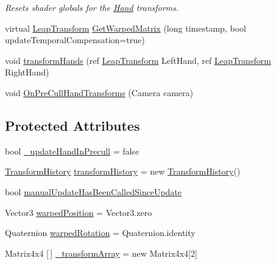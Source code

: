 \begin{DoxyCompactItemize}
\begin{DoxyCompactList}\small\item\em Resets shader globals for the \mbox{\hyperlink{class_leap_1_1_hand}{Hand}} transforms. \end{DoxyCompactList}\item 
virtual \mbox{\hyperlink{struct_leap_1_1_leap_transform}{Leap\+Transform}} \mbox{\hyperlink{class_leap_1_1_unity_1_1_leap_x_r_service_provider_a5a7dd26c6fcf64f5bd085be124fd69ed}{Get\+Warped\+Matrix}} (long timestamp, bool update\+Temporal\+Compensation=true)
\item 
void \mbox{\hyperlink{class_leap_1_1_unity_1_1_leap_x_r_service_provider_ad85fd202780306f400ee2609b37d3293}{transform\+Hands}} (ref \mbox{\hyperlink{struct_leap_1_1_leap_transform}{Leap\+Transform}} Left\+Hand, ref \mbox{\hyperlink{struct_leap_1_1_leap_transform}{Leap\+Transform}} Right\+Hand)
\item 
void \mbox{\hyperlink{class_leap_1_1_unity_1_1_leap_x_r_service_provider_a87c7baea1161c7819c2215f9483e6df6}{On\+Pre\+Cull\+Hand\+Transforms}} (Camera camera)
\end{DoxyCompactItemize}
\subsection*{Protected Attributes}
\begin{DoxyCompactItemize}
\item 
bool \mbox{\hyperlink{class_leap_1_1_unity_1_1_leap_x_r_service_provider_a5467eed05493c0cf4cc732568596f6eb}{\+\_\+update\+Hand\+In\+Precull}} = false
\item 
\mbox{\hyperlink{class_leap_1_1_unity_1_1_transform_history}{Transform\+History}} \mbox{\hyperlink{class_leap_1_1_unity_1_1_leap_x_r_service_provider_ad28d54cc0444a3ead31ecc3214e58b32}{transform\+History}} = new \mbox{\hyperlink{class_leap_1_1_unity_1_1_transform_history}{Transform\+History}}()
\item 
bool \mbox{\hyperlink{class_leap_1_1_unity_1_1_leap_x_r_service_provider_ad00d8ff3e04135ec3f23c90bd0a3b4ff}{manual\+Update\+Has\+Been\+Called\+Since\+Update}}
\item 
Vector3 \mbox{\hyperlink{class_leap_1_1_unity_1_1_leap_x_r_service_provider_aa4be13a6f05121d88aded72a447efd8f}{warped\+Position}} = Vector3.\+zero
\item 
Quaternion \mbox{\hyperlink{class_leap_1_1_unity_1_1_leap_x_r_service_provider_a2b4417c08a92b9ad2ef8f5dd76248915}{warped\+Rotation}} = Quaternion.\+identity
\item 
Matrix4x4 \mbox{[}$\,$\mbox{]} \mbox{\hyperlink{class_leap_1_1_unity_1_1_leap_x_r_service_provider_a5b9871acb331833b7f15215adb0d3015}{\+\_\+transform\+Array}} = new Matrix4x4\mbox{[}2\mbox{]}
\end{DoxyCompactItemize}
